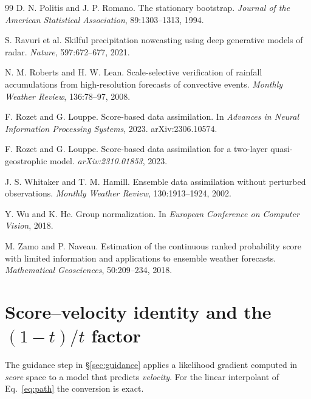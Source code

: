 \documentclass[10pt,twocolumn]{article}
\begin{document}
\begin{thebibliography}{99}
D. N. Politis and J. P. Romano.
The stationary bootstrap.
\emph{Journal of the American Statistical Association}, 89:1303--1313, 1994.

S. Ravuri et al.
Skilful precipitation nowcasting using deep generative models of radar.
\emph{Nature}, 597:672--677, 2021.

N. M. Roberts and H. W. Lean.
Scale-selective verification of rainfall accumulations from high-resolution forecasts of convective events.
\emph{Monthly Weather Review}, 136:78--97, 2008.

F. Rozet and G. Louppe.
Score-based data assimilation.
In \emph{Advances in Neural Information Processing Systems}, 2023.
arXiv:2306.10574.

F. Rozet and G. Louppe.
Score-based data assimilation for a two-layer quasi-geostrophic model.
\emph{arXiv:2310.01853}, 2023.

J. S. Whitaker and T. M. Hamill.
Ensemble data assimilation without perturbed observations.
\emph{Monthly Weather Review}, 130:1913--1924, 2002.

Y. Wu and K. He.
Group normalization.
In \emph{European Conference on Computer Vision}, 2018.

M. Zamo and P. Naveau.
Estimation of the continuous ranked probability score with limited information and applications to ensemble weather forecasts.
\emph{Mathematical Geosciences}, 50:209--234, 2018.

\end{thebibliography}

\onecolumn
\appendix

\section{Score--velocity identity and the $(1-t)/t$ factor}
\label{app:score}

The guidance step in \S\ref{sec:guidance} applies a likelihood gradient
computed in \emph{score} space to a model that predicts \emph{velocity}. For
the linear interpolant of Eq.~\eqref{eq:path} the conversion is exact.
\end{document}
